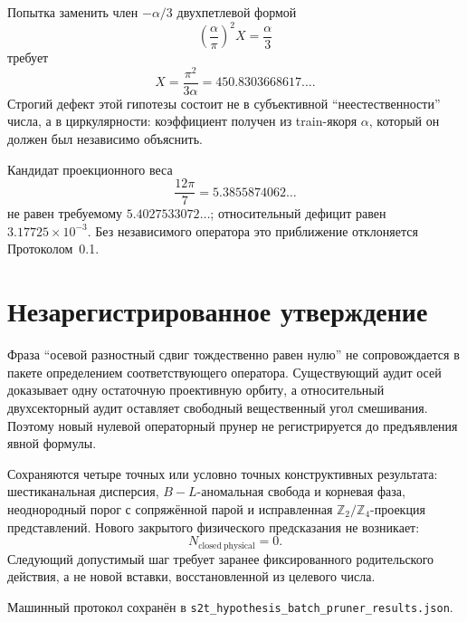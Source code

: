 Попытка заменить член \(-\alpha/3\) двухпетлевой формой
\begin{equation}
 \left(\frac{\alpha}{\pi}\right)^2X=\frac\alpha3
\end{equation}
требует
\begin{equation}
 X=\frac{\pi^2}{3\alpha}=450.8303668617\ldots.
\end{equation}
Строгий дефект этой гипотезы состоит не в субъективной
``неестественности'' числа, а в циркулярности: коэффициент получен из
train-якоря \(\alpha\), который он должен был независимо объяснить.

Кандидат проекционного веса
\begin{equation}
 \frac{12\pi}{7}=5.3855874062\ldots
\end{equation}
не равен требуемому
\(5.4027533072\ldots\); относительный дефицит равен
\(3.17725\times10^{-3}\). Без независимого оператора это приближение
отклоняется Протоколом~0.1.

\section{Незарегистрированное утверждение}

Фраза ``осевой разностный сдвиг тождественно равен нулю'' не сопровождается
в пакете определением соответствующего оператора. Существующий аудит осей
доказывает одну остаточную проективную орбиту, а относительный двухсекторный
аудит оставляет свободный вещественный угол смешивания. Поэтому новый
нулевой операторный прунер не регистрируется до предъявления явной формулы.

\begin{proposition}
Сохраняются четыре точных или условно точных конструктивных результата:
шестиканальная дисперсия, \(B-L\)-аномальная свобода и корневая фаза,
неоднородный порог с сопряжённой парой и исправленная
\(\mathbb Z_2/\mathbb Z_4\)-проекция представлений. Нового закрытого
физического предсказания не возникает:
\begin{equation}
 N_{\mathrm{closed\ physical}}=0.
\end{equation}
Следующий допустимый шаг требует заранее фиксированного родительского
действия, а не новой вставки, восстановленной из целевого числа.
\end{proposition}

Машинный протокол сохранён в
\texttt{s2t\_hypothesis\_batch\_pruner\_results.json}.